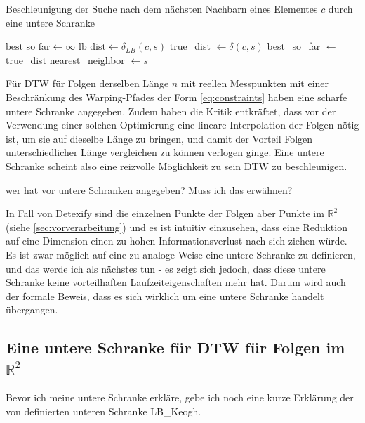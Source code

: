 \begin{algorithm}
  \caption{Beschleunigung der Suche nach dem nächsten Nachbarn eines Elementes \(c\) durch eine untere Schranke}
  \begin{algorithmic}
    \STATE $\text{best\_so\_far} \gets \infty$
      \STATE $\text{lb\_dist} \gets \delta_{LB}(c,s)$
        \STATE true\_dist $\gets \delta(c,s)$
          \STATE best\_so\_far $\gets$ true\_dist
          \STATE nearest\_neighbor $\gets s$
        \ENDIF
      \ENDIF
    \ENDFOR
  \end{algorithmic}
\end{algorithm}

Für DTW für Folgen derselben Länge $n$ mit reellen Messpunkten mit einer Beschränkung des Warping-Pfades der Form \ref{eq:constraints} haben \citet{Keogh:2005p7751} eine scharfe untere Schranke angegeben. Zudem haben \citet{Ratanamahatana:2004p7522} die Kritik entkräftet, dass vor der Verwendung einer solchen Optimierung eine lineare Interpolation der Folgen nötig ist, um sie auf dieselbe Länge zu bringen, und damit der Vorteil Folgen unterschiedlicher Länge vergleichen zu können verlogen ginge. Eine untere Schranke scheint also eine reizvolle Möglichkeit zu sein DTW zu beschleunigen.

\TODO wer hat vor \citet{Keogh:2005p7751} untere Schranken angegeben? Muss ich das erwähnen?

In Fall von Detexify sind die einzelnen Punkte der Folgen aber Punkte im \( \mathbb{R}^2 \) (siehe \ref{sec:vorverarbeitung}) und es ist intuitiv einzusehen, dass eine Reduktion auf eine Dimension einen zu hohen Informationsverlust nach sich ziehen würde. Es ist zwar möglich auf eine zu \cite{Keogh:2005p7751} analoge Weise eine untere Schranke zu definieren, und das werde ich als nächstes tun - es zeigt sich jedoch, dass diese untere Schranke keine vorteilhaften Laufzeiteigenschaften mehr hat. Darum wird auch der formale Beweis, dass es sich wirklich um eine untere Schranke handelt übergangen.

\subsection{Eine untere Schranke für DTW für Folgen im \( \mathbb{R}^2 \)}

Bevor ich meine untere Schranke erkläre, gebe ich noch eine kurze Erklärung der von \citet{Keogh:2005p7751} definierten unteren Schranke LB\_Keogh.

